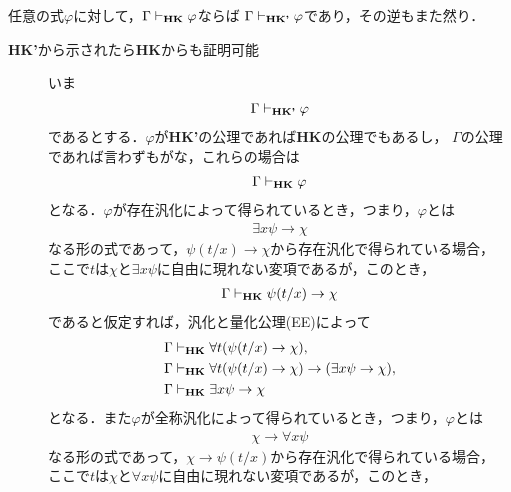	\begin{screen}
		\begin{metathm}[{\bf HK}と{\bf HK'}は同値]
			任意の式$\varphi$に対して，$\Gamma \vdash_{{\scriptsize \mbox{{\bf HK}}}} \varphi$ならば
			$\Gamma \vdash_{{\scriptsize \mbox{{\bf HK'}}}} \varphi$であり，その逆もまた然り．
		\end{metathm}
	\end{screen}
	
	\begin{metaprf}\mbox{}
		\begin{description}
			\item[{\bf HK'}から示されたら{\bf HK}からも証明可能]
			いま
			\begin{align}
				\Gamma \vdash_{{\scriptsize \mbox{{\bf HK'}}}} \varphi
			\end{align}
			であるとする．$\varphi$が{\bf HK'}の公理であれば{\bf HK}の公理でもあるし，
			$\Gamma$の公理であれば言わずもがな，これらの場合は
			\begin{align}
				\Gamma \vdash_{{\scriptsize \mbox{{\bf HK}}}} \varphi
			\end{align}
			となる．$\varphi$が存在汎化によって得られているとき，つまり，$\varphi$とは
			\begin{align}
				\exists x \psi \rightarrow \chi
			\end{align}
			なる形の式であって，$\psi(t/x) \rightarrow \chi$から存在汎化で得られている場合，
			ここで$t$は$\chi$と$\exists x \psi$に自由に現れない変項であるが，このとき，
			\begin{align}
				\Gamma \vdash_{{\scriptsize \mbox{{\bf HK}}}} \psi(t/x) \rightarrow \chi
			\end{align}
			であると仮定すれば，汎化と量化公理(EE)によって
			\begin{align}
				\Gamma &\vdash_{{\scriptsize \mbox{{\bf HK}}}} \forall t(\psi(t/x) \rightarrow \chi), \\
				\Gamma &\vdash_{{\scriptsize \mbox{{\bf HK}}}} \forall t(\psi(t/x) \rightarrow \chi)
					\rightarrow (\exists x \psi \rightarrow \chi), \\
				\Gamma &\vdash_{{\scriptsize \mbox{{\bf HK}}}} \exists x \psi \rightarrow \chi
			\end{align}
			となる．また$\varphi$が全称汎化によって得られているとき，つまり，$\varphi$とは
			\begin{align}
				\chi \rightarrow \forall x \psi
			\end{align}
			なる形の式であって，$\chi \rightarrow \psi(t/x)$から存在汎化で得られている場合，
			ここで$t$は$\chi$と$\forall x \psi$に自由に現れない変項であるが，このとき，

\end{description}
\end{metaprf}

